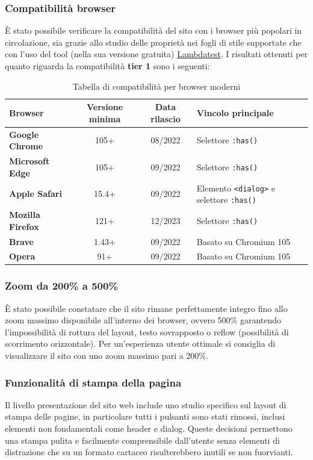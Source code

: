 \documentclass[a4paper,10pt]{article}
\begin{document}
	\subsubsection{Compatibilità browser}
	È stato possibile verificare la compatibilità del sito con i browser più popolari in circolazione, sia grazie allo studio delle proprietà nei fogli di stile supportate che con l'uso del tool (nella sua versione gratuita) \href{https://www.testmuai.com/cross-browser-testing/?_gl=1*z340lb*_up*MQ..*_ga*MTMwNzQ4ODQ5NS4xNzcxMzMwNzUw*_ga_QK7VZQJBWC*czE3NzEzMzA3NDckbzEkZzAkdDE3NzEzMzA3NDckajYwJGwwJGgw}{Lambdatest}. I risultati ottenuti per quanto riguarda la compatibilità \textbf{tier 1} sono i seguenti:
	
	\begin{table}[h!]
		\centering
		\begin{tabular}{lccl}
			\toprule
			\textbf{Browser} & \textbf{Versione minima} & \textbf{Data rilascio} & \textbf{Vincolo principale} \\
			\midrule
			\textbf{Google Chrome} & 105+ & 08/2022 & Selettore \texttt{:has()} \\
			\textbf{Microsoft Edge} & 105+ & 09/2022 & Selettore \texttt{:has()} \\
			\textbf{Apple Safari} & 15.4+ & 09/2022 & Elemento \texttt{<dialog>} e selettore \texttt{:has()} \\
			\textbf{Mozilla Firefox} & 121+ & 12/2023 & Selettore \texttt{:has()} \\
			\textbf{Brave} & 1.43+ & 09/2022 & Basato su Chromium 105 \\
			\textbf{Opera} & 91+ & 09/2022 & Basato su Chromium 105 \\
		\end{tabular}
		\caption{Tabella di compatibilità per browser moderni}
	\end{table}
	
	\subsubsection{Zoom da 200\% a 500\%}
	È stato possibile constatare che il sito rimane perfettamente integro fino allo zoom massimo disponibile all'interno dei browser, ovvero 500\% garantendo l'impossibilità di rottura del layout, testo sovrapposto o reflow (possibilità di scorrimento orizzontale). Per un'esperienza utente ottimale si consiglia di visualizzare il sito con uno zoom massimo pari a 200\%.
	
	\subsubsection{Funzionalità di stampa della pagina}
	Il livello presentazione del sito web include uno studio specifico sul layout di stampa delle pagine, in particolare tutti i pulsanti sono stati rimossi, inclusi elementi non fondamentali come header e dialog. Queste decisioni permettono una stampa pulita e facilmente comprensibile dall'utente senza elementi di distrazione che su un formato cartaceo risulterebbero inutili se non fuorvianti.
	
\end{document}
